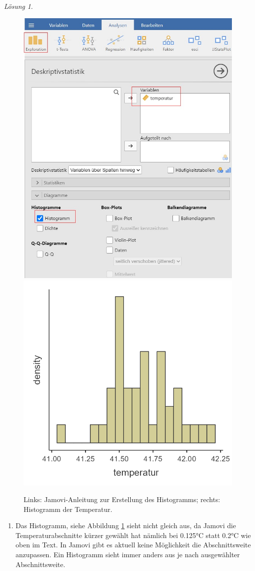 \documentclass[
]{book}
\providecommand{\tightlist}{%
  \setlength{\itemsep}{0pt}\setlength{\parskip}{0pt}}
\theoremstyle{definition}
\theoremstyle{definition}
\theoremstyle{definition}
\theoremstyle{definition}
\theoremstyle{remark}
\newtheorem*{solution}{Lösung}
\begin{document}
\begin{solution}
\leavevmode

\begin{figure}
  \includegraphics[width=0.5\linewidth]{figures/Enten_n40_instr_histogramm} \includegraphics[width=0.5\linewidth]{figures/Enten_n40} \caption{Links: Jamovi-Anleitung zur Erstellung des Histogramms; rechts: Histogramm der Temperatur.}\label{fig:enten-hist-mean-sd1}
  \end{figure}

\begin{enumerate}
\def\labelenumi{(\alph{enumi})}
\tightlist
\item
  Das Histogramm, siehe Abbildung \ref{fig:enten-hist-mean-sd1} sieht nicht gleich aus, da Jamovi die Temperaturabschnitte kürzer gewählt hat nämlich bei 0.125°C statt 0.2°C wie oben im Text. In Jamovi gibt es aktuell keine Möglichkeit die Abschnittsweite anzupassen. Ein Histogramm sieht immer anders aus je nach ausgewählter Abschnittsweite.
\end{enumerate}


\end{solution}
\end{document}
